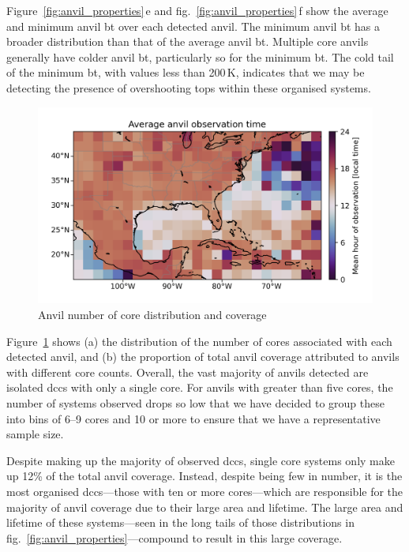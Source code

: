 Figure~\ref{fig:anvil_properties}\,e and fig.~\ref{fig:anvil_properties}\,f show the average and minimum anvil \acrshort{bt} over each detected anvil.
The minimum anvil \acrshort{bt} has a broader distribution than that of the average anvil \acrshort{bt}.
Multiple core anvils generally have colder anvil \acrshort{bt}, particularly so for the minimum \acrshort{bt}.
The cold tail of the minimum \acrshort{bt}, with values less than 200\,\unit{K}, indicates that we may be detecting the presence of overshooting tops within these organised systems.

\begin{figure}[tp]
    \centering
    \includegraphics[width=\textwidth]{figures/chapter2_25.png}
    \caption{Anvil number of core distribution and coverage}
    \label{fig:anvil_cores_and_coverage}
\end{figure}

Figure~\ref{fig:anvil_cores_and_coverage} shows (a) the distribution of the number of cores associated with each detected anvil, and (b) the proportion of total anvil coverage attributed to anvils with different core counts.
Overall, the vast majority of anvils detected are isolated \acrshort{dcc}s with only a single core.
For anvils with greater than five cores, the number of systems observed drops so low that we have decided to group these into bins of 6--9 cores and 10 or more to ensure that we have a representative sample size.

Despite making up the majority of observed \acrshort{dcc}s, single core systems only make up 12\% of the total anvil coverage.
Instead, despite being few in number, it is the most organised \acrshort{dcc}s---those with ten or more cores---which are responsible for the majority of anvil coverage due to their large area and lifetime.
The large area and lifetime of these systems---seen in the long tails of those distributions in fig.~\ref{fig:anvil_properties}---compound to result in this large coverage.



